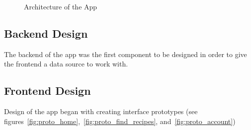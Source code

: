 \begin{figure}
    \centering
    
    \caption{\label{fig:architecture}Architecture of the App}
\end{figure}

\subsection{Backend Design}

The backend of the \chef{} app was the first component to be designed in order to give the frontend a data source to work with.

\subsection{Frontend Design}
Design of the \chef{} app began with creating interface prototypes (see figures~\ref{fig:proto_home},~\ref{fig:proto_find_recipes}, and~\ref{fig:proto_account})

